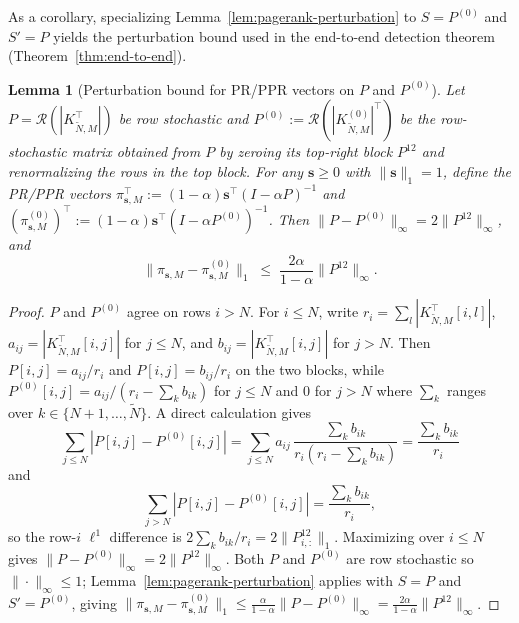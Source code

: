 \documentclass{article}
\theoremstyle{plain}
\newtheorem{lemma}[theorem]{Lemma}
\theoremstyle{definition}
\def\tp{\intercal}
\newcommand{\arXivtag}[1][]{#1}
\begin{document}
As a corollary, specializing Lemma~\ref{lem:pagerank-perturbation} to $S = P^{(0)}$ and $S' = P$ yields the perturbation bound used in the end-to-end detection theorem (Theorem~\ref{thm:end-to-end}).
	\begin{lemma}[Perturbation bound for PR/PPR vectors on $P$ and $P^{(0)}$]\label{lem:pr-ppr-perturbation}
		Let $P = \mathcal{R}(|K_{\tilde{N},M}^\tp|)$ be row stochastic and $P^{(0)} := \mathcal{R}(|K_{\tilde{N},M}^{(0)}|^\tp)$ be the row-stochastic matrix obtained from $P$ by zeroing its top-right block $P^{12}$ and renormalizing the \arXivtag[rows in the top block]. For any $\mathbf{s} \geq 0$ with $\|\mathbf{s}\|_1 = 1$, define the PR/PPR vectors $\pi_{\mathbf{s},M}^\tp := (1-\alpha)\mathbf{s}^\tp(I - \alpha P)^{-1}$ and $(\pi_{\mathbf{s},M}^{(0)})^\tp := (1-\alpha)\mathbf{s}^\tp(I - \alpha P^{(0)})^{-1}$. Then $\|P - P^{(0)}\|_\infty = 2\|P^{12}\|_\infty$, and
		\begin{equation}\label{eq:shared-perturbation}
			\|\pi_{\mathbf{s},M} - \pi_{\mathbf{s},M}^{(0)}\|_1 \;\leq\; \frac{2\alpha}{1-\alpha}\|P^{12}\|_\infty.
		\end{equation}
	\end{lemma}


\begin{proof}
	$P$ and $P^{(0)}$ agree on rows $i > N$. For $i \leq N$, write $r_i = \sum_l |K_{\tilde{N},M}^\tp[i,l]|$, $\arXivtag[a_{ij}] = |K_{\tilde{N},M}^\tp[i,j]|$ for $j \leq N$, and $\arXivtag[b_{ij}] = |K_{\tilde{N},M}^\tp[i,j]|$ for $j > N$. Then $P[i,j] = \arXivtag[a_{ij}]/r_i$ and $P[i,j] = \arXivtag[b_{ij}]/r_i$ on the two blocks, while $P^{(0)}[i,j] = \arXivtag[a_{ij}]/(r_i - \sum_{k} \arXivtag[b_{ik}])$ for $j \leq N$ and $0$ for $j > N$ \arXivtag[ where $\sum_{k}$ ranges over $k\in\{N+1,\ldots,\tilde{N}\}$.] A direct calculation gives
		\[
		\sum_{j \leq N}|P[i,j] - P^{(0)}[i,j]| = \sum_{j \leq N} \arXivtag[a_{ij}]\,\frac{\sum_{k} \arXivtag[b_{ik}]}{r_i(r_i-\sum_{k} \arXivtag[b_{ik}])} = \frac{\sum_{k} \arXivtag[b_{ik}]}{r_i}
		\]
        and
        \[
        \sum_{j > N}|P[i,j] - P^{(0)}[i,j]| = \frac{\sum_{k} \arXivtag[b_{ik}]}{r_i},
        \]
		so the row-$i$ $\ell^1$ difference is $2\sum_{k} \arXivtag[b_{ik}]/r_i = 2\|P^{12}_{i,:}\|_1$. 
        Maximizing over $i \leq N$ gives $\|P - P^{(0)}\|_\infty = 2\|P^{12}\|_\infty$. Both $P$ and $P^{(0)}$ are row stochastic so $\|\cdot\|_\infty \leq 1$; Lemma~\ref{lem:pagerank-perturbation} applies with \arXivtag[$S = P$ and $S' = P^{(0)}$], giving $\|\pi_{\mathbf{s},M} - \pi_{\mathbf{s},M}^{(0)}\|_1 \leq \frac{\alpha}{1-\alpha}\|P-P^{(0)}\|_\infty = \frac{2\alpha}{1-\alpha}\|P^{12}\|_\infty$. \qedhere
\end{proof}
\end{document}
